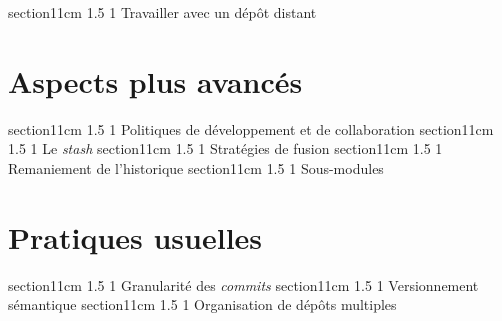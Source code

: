 \documentclass[a4paper,twoside,french]{book}
\makeatletter
\renewcommand\section{\@startsection
  {section}{1}{1cm}%
  {1.5\baselineskip}%
  {1\baselineskip}%
  {\normalfont\Large\bfseries}}%
\makeatother
\begin{document}
\section{Travailler avec un dépôt distant}

\chapter{Aspects plus avancés} %
\section{Politiques de développement et de collaboration} %
\section{Le \textit{stash}} %
\section{Stratégies de fusion} %
\section{Remaniement de l'historique}
\section{Sous-modules} %

\chapter{Pratiques usuelles}
\section{Granularité des \textit{commits}} %
\section{Versionnement sémantique} 
\section{Organisation de dépôts multiples}
\end{document}
